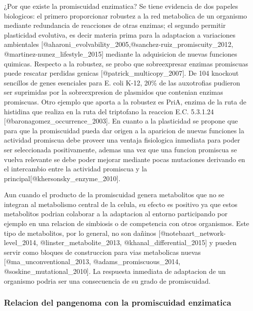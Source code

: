 \documentclass[]{article}
\begin{document}
¿Por que existe la promiscuidad enzimatica? Se tiene evidencia de dos
papeles biologicos: el primero proporcionar robustez a la red metabolica
de un organismo mediante redundancia de reacciones de otras enzimas; el
segundo permitir plasticidad evolutiva, es decir materia prima para la
adaptacion a variaciones ambientales
{[}@aharoni\_evolvability\_2005,@sanchez-ruiz\_promiscuity\_2012,
@martinez-nunez\_lifestyle\_2015{]} mediante la adquisicion de nuevas
funciones quimicas. Respecto a la robustez, se probo que sobreexpresar
enzimas promiscuas puede rescatar perdidas genicas
{[}@patrick\_multicopy\_2007{]}. De 104 knockout sencillos de genes
esenciales para E. coli K-12, 20\% de las auxotrofias pudieron ser
suprimidas por la sobreexpresion de plasmidos que contenian enzimas
promiscuas. Otro ejemplo que aporta a la robustez es PriA, enzima de la
ruta de histidina que realiza en la ruta del triptofano la reaccion E.C.
5.3.1.24 {[}@baronagomez\_occurrence\_2003{]}. En cuanto a la
plasticidad se propone que para que la promiscuidad pueda dar origen a
la aparicion de nuevas funciones la actividad promiscua debe proveer una
ventaja fisiologica inmediata para poder ser seleccionada positivamente,
ademas una vez que una funcion promiscua se vuelva relevante se debe
poder mejorar mediante pocas mutaciones derivando en el intercambio
entre la actividad promiscua y la
principal{[}@khersonsky\_enzyme\_2010{]}.

Aun cuando el producto de la promiscuidad genera metabolitos que no se
integran al metabolismo central de la celula, su efecto es positivo ya
que estos metabolitos podrian colaborar a la adaptacion al entorno
participando por ejemplo en una relacion de simbiosis o de competencia
con otros organismos. Este tipo de metabolitos, por lo general, no son
dañinos {[}@notebaart\_network-level\_2014, @linster\_metabolite\_2013,
@khanal\_differential\_2015{]} y pueden servir como bloques de
construccion para vias metabolicas nuevas {[}@ma\_unconventional\_2013,
@adams\_promiscuous\_2014, @soskine\_mutational\_2010{]}. La respuesta
inmediata de adaptacion de un organismo podria ser una consecuencia de
su grado de promiscuidad.

\subsubsection{Relacion del pangenoma con la promiscuidad
enzimatica}\label{relacion-del-pangenoma-con-la-promiscuidad-enzimatica}
\end{document}
